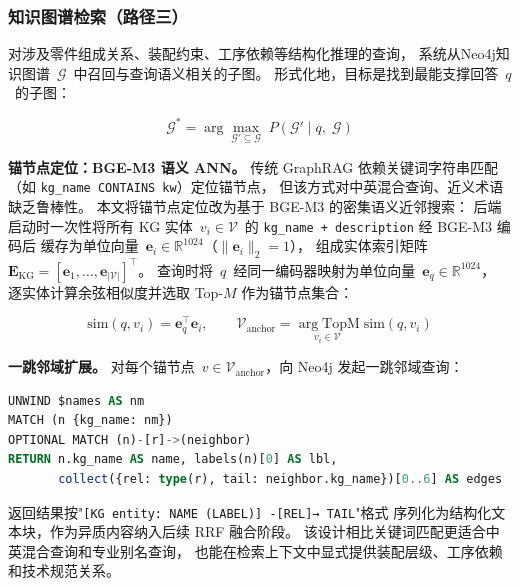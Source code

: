 \subsubsection{知识图谱检索（路径三）}
\label{sec:kg-retrieval}

对涉及零件组成关系、装配约束、工序依赖等结构化推理的查询，
系统从Neo4j知识图谱~$\mathcal{G}$~中召回与查询语义相关的子图。
形式化地，目标是找到最能支撑回答~$q$~的子图：

\begin{equation}
  \mathcal{G}^{*}
  = \arg\max_{\mathcal{G}' \subseteq \mathcal{G}}\;
    P\!\left(\mathcal{G}' \mid q,\; \mathcal{G}\right)
  \label{eq:kg-retrieval}
\end{equation}

\textbf{锚节点定位：BGE-M3 语义 ANN。}
传统 GraphRAG 依赖关键词字符串匹配（如 \texttt{kg\_name CONTAINS kw}）定位锚节点，
但该方式对中英混合查询、近义术语缺乏鲁棒性。
本文将锚节点定位改为基于 BGE-M3 的密集语义近邻搜索：
后端启动时一次性将所有 KG 实体~$v_i \in \mathcal{V}$~的
\texttt{kg\_name + description} 经 BGE-M3 编码后
缓存为单位向量~$\mathbf{e}_i \in \mathbb{R}^{1024}$（$\|\mathbf{e}_i\|_2 = 1$），
组成实体索引矩阵~$\mathbf{E}_{\text{KG}} = [\mathbf{e}_1, \dots, \mathbf{e}_{|\mathcal{V}|}]^{\top}$。
查询时将~$q$~经同一编码器映射为单位向量~$\mathbf{e}_q \in \mathbb{R}^{1024}$，
逐实体计算余弦相似度并选取 Top-$M$ 作为锚节点集合：

\begin{equation}
  \mathrm{sim}(q, v_i) = \mathbf{e}_q^{\top} \mathbf{e}_i, \qquad
  \mathcal{V}_{\text{anchor}}
    = \underset{v_i \in \mathcal{V}}{\arg\mathrm{TopM}}\;\mathrm{sim}(q, v_i)
  \label{eq:kg-anchor-ann}
\end{equation}

\textbf{一跳邻域扩展。}
对每个锚节点~$v \in \mathcal{V}_{\text{anchor}}$，向 Neo4j 发起一跳邻域查询：

\begin{lstlisting}[language=SQL, caption={基于 ANN 锚节点的子图召回}]
UNWIND $names AS nm
MATCH (n {kg_name: nm})
OPTIONAL MATCH (n)-[r]->(neighbor)
RETURN n.kg_name AS name, labels(n)[0] AS lbl,
       collect({rel: type(r), tail: neighbor.kg_name})[0..6] AS edges
\end{lstlisting}

返回结果按"\texttt{[KG entity: NAME (LABEL)] -[REL]→ TAIL}"格式
序列化为结构化文本块，作为异质内容纳入后续 RRF 融合阶段。
该设计相比关键词匹配更适合中英混合查询和专业别名查询，
也能在检索上下文中显式提供装配层级、工序依赖和技术规范关系。


